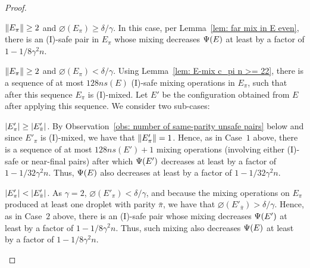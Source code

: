 \begin{proof}
\begin{description}
	\end{description}	

	
	\medskip\noindent
	 ${\|E_{\pi}\|}\geq 2$ and $\diameter(E_\pi)\geq\delta/\gamma$.
	In this case, per Lemma~\ref{lem: far mix in E even},	
	there is an (I)-safe pair in $E_{\pi}$ whose mixing decreases
	${\Psi}(E)$ at least by a factor of $1 - 1/8\gamma^2n$.
	
	
	\medskip\noindent
	 ${\|E_{\pi}\|}\geq 2$ and $\diameter(E_\pi)<\delta/\gamma$.
	Using Lemma~\ref{lem: E-mix c_pi n >= 22}, there is a sequence of at most
	$128ns(E)$ (I)-safe mixing operations in $E_\pi$, such that after this sequence
	$E_{\pi}$ is (I)-mixed. Let $E'$ be the configuration obtained from $E$
	after applying this sequence. We consider two sub-cases:	
	
	\begin{description}

		\item{} ${|E'_{\pi}|}\geq{|E'_{\bar{\pi}}|}$.
		By Observation~\ref{obs: number of same-parity unsafe pairs} below and
		since $E'_{\pi}$ is (I)-mixed, we have that ${\|E'_{\pi}\|}=1$.		
		Hence, as in Case~$1$ above, there is a sequence of at most $128ns(E')+1$ mixing operations 
		(involving either (I)-safe or near-final pairs)
		after which ${\Psi}(E')$ decreases at least by a factor of $1-1/32\gamma^2n$.
		Thus, ${\Psi}(E)$ also decreases at least by a factor of $1 - 1/32\gamma^2n$.

		\item{} ${|E'_{\pi}|}<{|E'_{\bar{\pi}}|}$.
		As $\gamma=2$, $\diameter(E'_\pi)<\delta/\gamma$, and 
		because	the mixing operations on $E_{\pi}$ produced at least one droplet 
		with parity $\bar{\pi}$, we have that 
		$\diameter(E'_{\bar{\pi}})>\delta/\gamma$.
		Hence, as in Case~$2$ above, 
		there is an (I)-safe pair whose mixing decreases
		${\Psi}(E')$ at least by a factor of $1 - 1/8\gamma^2n$.
		Thus, such mixing also decreases ${\Psi}(E)$ at least by a factor of $1 - 1/8\gamma^2n$.				
	\end{description}
	

\end{proof}
